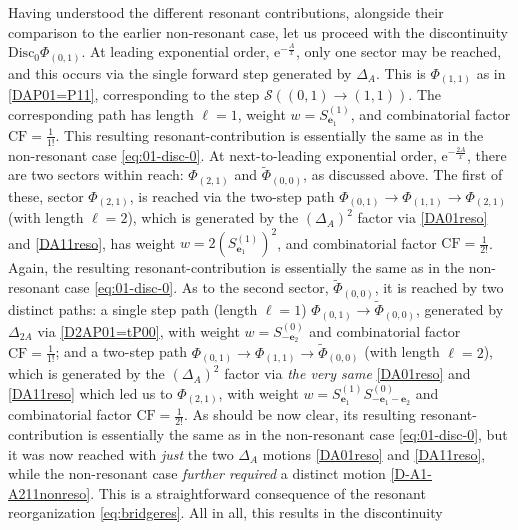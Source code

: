 \documentclass[11pt,a4paper]{article}
\def\disc{{\mathrm{Disc}}}
\begin{document}
Having understood the different resonant contributions, alongside their comparison to the earlier non-resonant case, let us proceed with the discontinuity $\disc_0 \Phi_{(0,1)}$. At leading exponential order, $\mathrm{e}^{-\frac{A}{x}}$, only one sector may be reached, and this occurs via the single forward step generated by $\Delta_A$. This is $\Phi_{(1,1)}$ as in \eqref{DAP01=P11}, corresponding to the step $\mathcal{S} \left( (0,1) \rightarrow (1,1) \right)$. The corresponding path has length $\ell=1$, weight $w = S^{(1)}_{\boldsymbol{e}_1}$, and combinatorial factor $\mathrm{CF}=\frac{1}{1!}$. This resulting resonant-contribution is essentially the same as in the non-resonant case \eqref{eq:01-disc-0}. At next-to-leading exponential order, $\mathrm{e}^{-\frac{2A}{x}}$, there are two sectors within reach: $\Phi_{(2,1)}$ and $\widetilde{\Phi}_{(0,0)}$, as discussed above. The first of these, sector $\Phi_{(2,1)}$, is reached via the two-step path $\Phi_{(0,1)} \rightarrow \Phi_{(1,1)} \rightarrow \Phi_{(2,1)}$ (with length $\ell=2$), which is generated by the $\left( \Delta_A \right)^2$ factor via \eqref{DA01reso} and \eqref{DA11reso}, has weight $w = 2 \left( S^{(1)}_{\boldsymbol{e}_1} \right)^2$, and combinatorial factor $\mathrm{CF}=\frac{1}{2!}$. Again, the resulting resonant-contribution is essentially the same as in the non-resonant case \eqref{eq:01-disc-0}. As to the second sector, $\widetilde\Phi_{(0,0)}$, it is reached by two distinct paths: a single step path (length $\ell=1$) $\Phi_{(0,1)} \rightarrow \widetilde{\Phi}_{(0,0)}$, generated by $\Delta_{2A}$ via \eqref{D2AP01=tP00}, with weight $w = S^{(0)}_{-\boldsymbol{e}_2}$ and combinatorial factor $\mathrm{CF}=\frac{1}{1!}$; and a two-step path $\Phi_{(0,1)} \rightarrow \Phi_{(1,1)} \rightarrow \widetilde{\Phi}_{(0,0)}$ (with length $\ell=2$), which is generated by the $\left( \Delta_A \right)^2$ factor via \textit{the very same} \eqref{DA01reso} and \eqref{DA11reso} which led us to $\Phi_{(2,1)}$, with weight $w = S^{(1)}_{\boldsymbol{e}_1} S^{(0)}_{-\boldsymbol{e}_1-\boldsymbol{e}_2}$ and combinatorial factor $\mathrm{CF}=\frac{1}{2!}$. As should be now clear, its resulting resonant-contribution is essentially the same as in the non-resonant case \eqref{eq:01-disc-0}, but it was now reached with \textit{just} the two $\Delta_A$ motions \eqref{DA01reso} and \eqref{DA11reso}, while the non-resonant case \textit{further required} a distinct motion \eqref{D-A1-A211nonreso}. This is a straightforward consequence of the resonant reorganization \eqref{eq:bridgeres}. All in all, this results in the discontinuity
\end{document}
